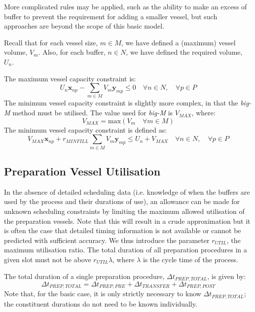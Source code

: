 More complicated rules may be applied, such as the ability to make an excess
of buffer to prevent the requirement for adding a smaller vessel, but such
approaches are beyond the scope of this basic model.

Recall that for each vessel size, $m \in M$, we have defined a (maximum) vessel
volume, $V_{m}$. Also, for each buffer, $n \in N$, we have defined the required
volume, $U_{n}$.

The maximum vessel capacity constraint is:
\begin{equation}
    U_{n} \boldsymbol{x}_{np} - \sum_{m \in M} V_{m} \boldsymbol{y}_{mp} \le 0
    \quad \forall n \in N, \quad \forall p \in P
    \label{eq.constr3a}
\end{equation}
The minimum vessel capacity constraint is slightly more complex, in that the
\emph{big-M} method must be utilised. The value used for \emph{big-M} is
$V_{MAX}$, where:
\begin{equation}
    V_{MAX} = \text{max} \left( V_{m} \quad \forall m \in M \right)
\end{equation}
The minimum vessel capacity constraint is defined as:
\begin{equation}
    V_{MAX} \boldsymbol{x}_{np} + r_{MINFILL} \sum_{m \in M} V_{m}
    \boldsymbol{y}_{mp} \le U_{n} + V_{MAX} \quad \forall n \in N, \quad
    \forall p \in P
    \label{eq.constr3b}
\end{equation}

\subsection{Preparation Vessel Utilisation}\label{SS.constr4}

In the absence of detailed scheduling data (i.e. knowledge of when the buffers
are used by the process and their durations of use), an allowance can be made
for unknown scheduling constraints by limiting the maximum allowed utilisation
of the preparation vessels.
Note that this will result in a crude approximation but it is often the case
that detailed timing information is not available or cannot be predicted with
sufficient accuracy.
We thus introduce the parameter $r_{UTIL}$, the maximum utilisation ratio.
The total duration of all preparation procedures in a given slot must not
be above $r_{UTIL} \lambda$, where $\lambda$ is the cycle time of the process.

The total duration of a single preparation procedure, $\Delta t_{PREP,TOTAL}$,
is given by:
\begin{equation}
    \Delta t_{PREP,TOTAL} = \Delta t_{PREP,PRE} + \Delta t_{TRANSFER} +
    \Delta t_{PREP,POST}
\end{equation}
Note that, for the basic case, it is only strictly necessary to know
$\Delta t_{PREP,TOTAL}$; the constituent durations do not need to be known
individually.


